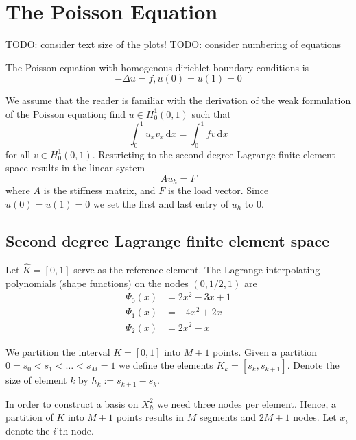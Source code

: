 \section{The Poisson Equation}

TODO: consider text size of the plots!
TODO: consider numbering of equations

The Poisson equation with homogenous dirichlet boundary conditions is
\begin{equation}
    - \Delta u = f, u(0) = u(1) = 0
\end{equation}

We assume that the reader is familiar with the
derivation of the weak formulation of the Poisson equation;
find \( u \in H_0^1(0, 1) \) such that
\begin{equation}
  \label{eq:weak}
    \int_{0}^{1}u_x v_x \,\mathrm{d}x = \int_{0}^{1}f v \,\mathrm{d}x
\end{equation}
for all \( v \in H^1_0 (0,1)\).
Restricting to the second degree Lagrange finite element space
results in the linear system
\begin{equation}
    Au_h = F
\end{equation}
where \( A \) is the stiffness matrix,
and \( F \) is the load vector.
Since \( u(0) = u(1) = 0 \) we set
the first and last entry of \( u_h \)
to \( 0 \).

\subsection{Second degree Lagrange finite element space}\label{sec:sec}

Let \( \hat{K} = [0, 1] \) serve as the reference element.
The Lagrange interpolating polynomials (shape functions)
on the nodes \( (0, 1/2, 1) \) are
\begin{align}
  \Psi_0(x) &= 2x^2 - 3x + 1\\
  \Psi_1(x) &= -4x^2 + 2x\\
  \Psi_2(x) &= 2x^2 - x
\end{align}

We partition the interval \( K = [0, 1] \) into \( M + 1 \) points.
Given a partition \( 0 = s_0 < s_1 < \dots < s_M = 1  \)
we define the elements \( K_k = [s_{k}, s_{k+1}] \).
Denote the size of element \( k \) by \( h_k := s_{k+1} - s_{k} \).

In order to construct a basis on \( X_h^2 \) we need three
nodes per element.
Hence, a partition of \( K \) into \( M + 1 \) points
results in \( M \) segments and \( 2M + 1 \) nodes.
Let \( x_i \) denote the \( i \)'th node.

